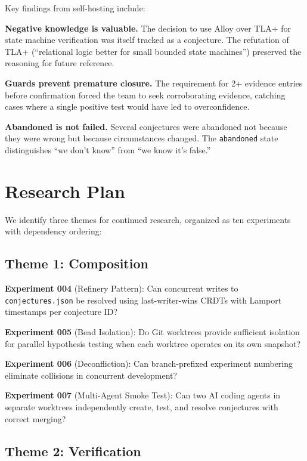 \documentclass[sigconf,screen]{acmart}
\begin{document}
Key findings from self-hosting include:

\textbf{Negative knowledge is valuable.} The decision to use Alloy over TLA+ for state machine verification was itself tracked as a conjecture. The refutation of TLA+ (``relational logic better for small bounded state machines'') preserved the reasoning for future reference.

\textbf{Guards prevent premature closure.} The requirement for 2+ evidence entries before confirmation forced the team to seek corroborating evidence, catching cases where a single positive test would have led to overconfidence.

\textbf{Abandoned is not failed.} Several conjectures were abandoned not because they were wrong but because circumstances changed. The \texttt{abandoned} state distinguishes ``we don't know'' from ``we know it's false.''

\section{Research Plan}\label{sec:research}

We identify three themes for continued research, organized as ten experiments with dependency ordering:

\subsection{Theme 1: Composition}

\textbf{Experiment 004} (Refinery Pattern): Can concurrent writes to \texttt{conjectures.json} be resolved using last-writer-wins CRDTs with Lamport timestamps per conjecture ID?

\textbf{Experiment 005} (Bead Isolation): Do Git worktrees provide sufficient isolation for parallel hypothesis testing when each worktree operates on its own snapshot?

\textbf{Experiment 006} (Deconfliction): Can branch-prefixed experiment numbering eliminate collisions in concurrent development?

\textbf{Experiment 007} (Multi-Agent Smoke Test): Can two AI coding agents in separate worktrees independently create, test, and resolve conjectures with correct merging?

\subsection{Theme 2: Verification}
\end{document}
